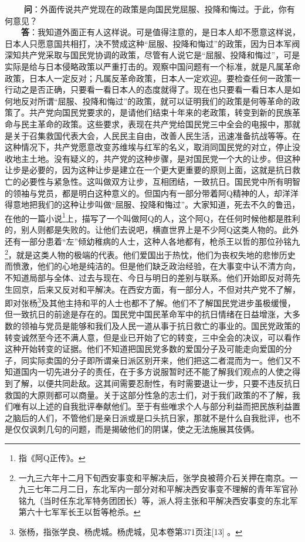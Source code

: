 \documentclass[cn,11pt,chinese]{elegantbook}
\begin{document}
　　
\textbf{问}：外面传说共产党现在的政策是向国民党屈服、投降和悔过。于此，你有何意见？\\
　　\textbf{答}：我知道外面正有人这样说。可是值得注意的，是日本人却不愿意这样说，日本人只愿意国共相打，决不赞成这种“屈服、投降和悔过”的政策，因为日本军阀深知共产党采取与国民党协调的政策，尽管有人说它是“屈服、投降和悔过”，可是实际是给与日本侵略政策以严重打击的。观察中国问题有一个标准，就是凡属革命政策，日本人一定反对；凡属反革命政策，日本人一定欢迎。要检查任何一政策一行动之是否正确，只要看一看日本人的态度就得了。现在也只要看一看日本人是如何地反对所谓“屈服、投降和悔过”的政策，就可以证明我们的政策是何等革命的政策了。共产党向国民党要求的，是请他们结束十年来的老政策，转变到新的民族革命与民主革命的政策。这些要求，表现在共产党给国民党三中全会的电报中，那就是关于召集救国代表大会，人民民主自由，改善人民生活，迅速准备抗战等等。在这种情况下，共产党愿意改变苏维埃与红军的名义，取消同国民党的对立，停止没收地主土地。没有疑义的，共产党的这种步骤，是对国民党一个大的让步。但这种让步是必要的，因为这种让步是建立在一个更大更重要的原则上面，这就是抗日救亡的必要性与紧急性。这叫做双方让步，互相团结，一致抗日。国民党中所有明智的领袖与党员，都是明白这种意义的。但国内有一部分带着阿Q精神的人，却洋洋得意地把我们的这种让步叫做“屈服、投降和悔过”。大家知道，死去不久的鲁迅，在他的一篇小说\footnote[17]{指《阿Q正传》。}上，描写了一个叫做阿Q的人，这个阿Q，在任何时候他都是胜利的，别人则都是失败的。让他们去说吧，横直世界上是不少阿Q这类人物的。此外还有一部分患着“左”倾幼稚病的人士，这种人各地都有，枪杀王以哲的那位孙铭九\footnote[18]{一九三六年十二月下旬西安事变和平解决后，张学良被蒋介石关押在南京。一九三七年二月二日，东北军内一部分对和平解决西安事变不理解的青年军官孙铭九（当时任东北军特务团团长）等，派人将主张和平解决西安事变的东北军第六十七军军长王以哲等枪杀。}，就是这类人物的极端的代表。他们爱国出于热忱，他们为丧权失地的悲惨历史而愤激，他们的心地是纯洁的。但是他们缺乏政治经验，在大事变中认不清方向，不知道局部与全体、过去与现在、今日与明日的差别与联系。他们开始即反对蒋先生回京，后来又反对和平解决。在西安方面，有一部分人，不但对共产党不了解，即对张杨\footnote[19]{张杨，指张学良、杨虎城。杨虎城，见本卷第371页注[13] 。}及其他主持和平的人士也都不了解。他们不了解国民党进步虽极缓慢，但一致抗日的前途是存在的。国民党中国民革命军中的抗日情绪在日益增涨，大多数的领袖与党员是能够和我们及人民一道从事于抗日救亡的事业的。国民党政策的转变诚然至今还不满人意，但是业已开始了它的转变，三中全会的决议，可以看作这种开始转变的证据。他们不知道把国民党多数的爱国分子及可能走向爱国的分子，同实际卖国的分子即所谓亲日派区别开来，他们把这二者混而为一。他们又不知道国内一切先进分子的责任，在于多方说服暂时还不能了解我们观点的人使之得到了解，以便共同赴敌。这其间需要忍耐性，有时需要退让一步，只要不违反抗日救国的大原则都可以商量。关于这部分性急的志士们，对于我们政策的不了解，我们唯有以上述的自我批评奉献他们。至于有些唯求个人与部分利益而把民族利益置之脑后的人们，不管他们是亲日派或是口头抗日家，那就不是什么自我批评，也不是仅仅讽刺几句的问题，而是揭破他们的阴谋，使之无法施展其伎俩。\\
\end{document}
